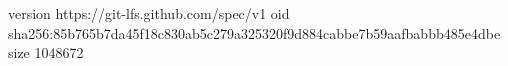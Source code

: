 version https://git-lfs.github.com/spec/v1
oid sha256:85b765b7da45f18c830ab5c279a325320f9d884cabbe7b59aafbabbb485e4dbe
size 1048672
